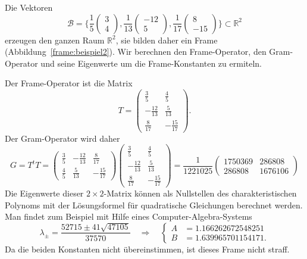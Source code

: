 \begin{beispiel}
Die Vektoren
\[
\mathcal{B} 
=
\biggl\{
\frac15
\begin{pmatrix} 3\\4\end{pmatrix},
\frac1{13}
\begin{pmatrix} -12\\5\end{pmatrix},
\frac1{17}
\begin{pmatrix} 8\\-15\end{pmatrix}
\biggr\}
\subset \mathbb R^2
\]
erzeugen den ganzen Raum $\mathbb R^2$, sie bilden daher ein
Frame (Abbildung~\ref{frame:beispiel2}).
Wir berechnen den Frame-Operator, den Gram-Operator und seine Eigenwerte
um die Frame-Konstanten zu ermiteln.

Der Frame-Operator ist die Matrix
\[
T
=
\begin{pmatrix}
 \frac{ 3}{ 5}& \frac{ 4}{ 5}\\[2pt]
-\frac{12}{13}& \frac{ 5}{13}\\[2pt]
 \frac{ 8}{17}&-\frac{15}{17}
\end{pmatrix}.
\]
Der Gram-Operator wird daher
\[
G=T^tT
=
\begin{pmatrix}
 \frac{ 3}{ 5}&-\frac{12}{13}&  \frac{ 8}{17}\\[2pt]
 \frac{ 4}{ 5}& \frac{ 5}{13}& -\frac{15}{17}
\end{pmatrix}
\begin{pmatrix}
 \frac{ 3}{ 5}& \frac{ 4}{ 5}\\[2pt]
-\frac{12}{13}& \frac{ 5}{13}\\[2pt]
 \frac{ 8}{17}&-\frac{15}{17}
\end{pmatrix}
=
\frac{1}{1221025}
\begin{pmatrix}
1750369&  286808 \\
 286808& 1676106
\end{pmatrix}
\]
Die Eigenwerte dieser $2\times 2$-Matrix können als Nullstellen des
charakteristischen Polynoms mit der Lösungsformel für quadratische
Gleichungen berechnet werden.
Man findet zum Beispiel mit Hilfe eines Computer-Algebra-Systems
\[
\lambda_{\pm}
=
\frac{52715\pm 41\sqrt{47105}}{37570}
\quad\Rightarrow\quad
\left\{
\begin{aligned}
A&=
1.166262672548251
\\
B&=
1.639965701154171.
\end{aligned}
\right.
\]
Da die beiden Konstanten nicht übereinstimmen, ist dieses Frame
nicht straff.
\end{beispiel}

